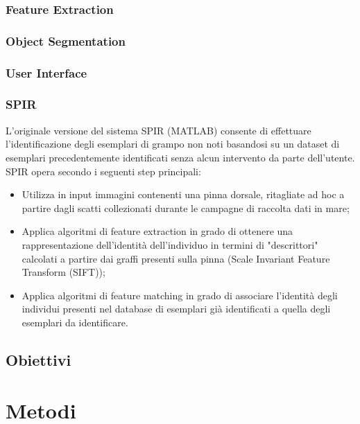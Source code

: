 \documentclass[a4paper,12pt]{report}
\begin{document}
    \subsection{Feature Extraction}
    \subsection{Object Segmentation}
    \subsection{User Interface}
    \subsection{SPIR}
    L'originale versione del sistema SPIR (MATLAB) consente di effettuare l’identificazione degli esemplari di 
    grampo non noti basandosi su un dataset di esemplari precedentemente identificati senza alcun intervento da parte dell’utente. SPIR opera secondo i seguenti 
    step principali:
    \begin{itemize}
      \item Utilizza in input immagini contenenti una pinna dorsale, ritagliate ad hoc a 
      partire dagli scatti collezionati durante le campagne di raccolta dati
      in mare;      
      \item Applica algoritmi di feature extraction in grado di ottenere una 
      rappresentazione dell’identità dell’individuo in termini di "descrittori" calcolati 
      a partire dai graffi presenti sulla pinna (Scale
      Invariant Feature Transform (SIFT));
      \item Applica algoritmi di feature matching in grado di associare l’identità degli individui presenti 
      nel database di esemplari già identificati a quella degli esemplari da identificare. 
    
    \end{itemize}

  \section{Obiettivi}

\chapter{Metodi}
\end{document}
